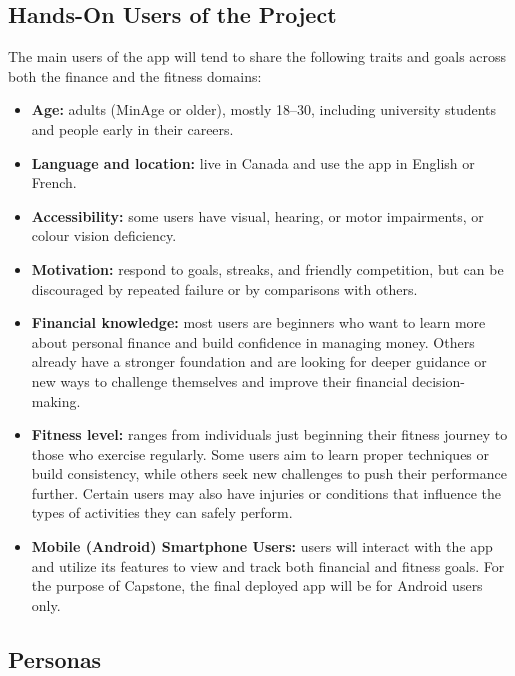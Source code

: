 \documentclass[12pt]{article}
\begin{document}
\subsection{Hands-On Users of the Project}
\label{sec:user-characteristics}
The main users of the app will tend to share the following traits and goals across both the finance and the fitness domains:
\begin{itemize}
    \item \textbf{Age:} adults (MinAge or older), mostly 18--30, including university students and people early in their careers.

    \item \textbf{Language and location:} live in Canada and use the app in English or French.

    \item \textbf{Accessibility:} some users have visual, hearing, or motor impairments, or colour vision deficiency.

    \item \textbf{Motivation:} respond to goals, streaks, and friendly competition, but can be discouraged by repeated failure or by comparisons with others.

    \item \textbf{Financial knowledge:} most users are beginners who want to learn more about personal finance and build confidence in managing money. Others already have a stronger foundation and are looking for deeper guidance or new ways to challenge themselves and improve their financial decision-making.

    \item \textbf{Fitness level:} ranges from individuals just beginning their fitness journey to those who exercise regularly. Some users aim to learn proper techniques or build consistency, while others seek new challenges to push their performance further. Certain users may also have injuries or conditions that influence the types of activities they can safely perform.

    \item \textbf{Mobile (Android) Smartphone Users:} users will interact with the app and utilize its features to view and track both financial and fitness goals. For the purpose of Capstone, the final deployed app will be for Android users only.
\end{itemize}
\subsection{Personas}
\end{document}
